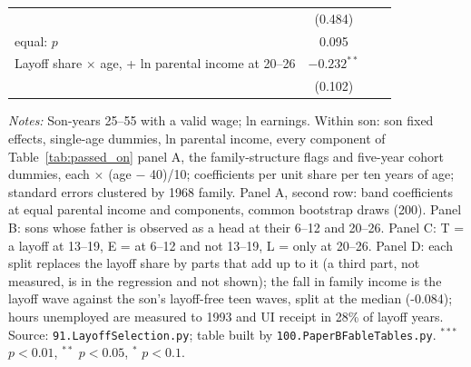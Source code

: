 \begin{table}[!htbp]
{{\begin{tabular}{lccc}
 & (0.484) &  &  \\
\quad equal: $p$ & 0.095 &  &  \\
Layoff share $\times$ age, + ln parental income at 20--26 & $-0.232^{**}$ &  &  \\
 & (0.102) &  &  \\
\bottomrule
\end{tabular}}}
\par\smallskip
\begin{minipage}{\textwidth}\footnotesize \textit{Notes:} Son-years 25--55 with a valid wage; ln earnings. Within son: son fixed effects, single-age dummies, ln parental income, every component of Table~\ref{tab:passed_on} panel A, the family-structure flags and five-year cohort dummies, each $\times$ (age $-$ 40)/10; coefficients per unit share per ten years of age; standard errors clustered by 1968 family. Panel A, second row: band coefficients at equal parental income and components, common bootstrap draws (200). Panel B: sons whose father is observed as a head at their 6--12 and 20--26. Panel C: T = a layoff at 13--19, E = at 6--12 and not 13--19, L = only at 20--26. Panel D: each split replaces the layoff share by parts that add up to it (a third part, not measured, is in the regression and not shown); the fall in family income is the layoff wave against the son's layoff-free teen waves, split at the median (-0.084); hours unemployed are measured to 1993 and UI receipt in 28\% of layoff years. Source: \texttt{91.LayoffSelection.py}; table built by \texttt{100.PaperBFableTables.py}. $^{***}$ $p<0.01$, $^{**}$ $p<0.05$, $^{*}$ $p<0.1$.\end{minipage}
\end{table}
